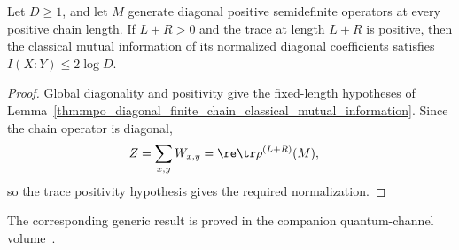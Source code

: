 \begin{corollary}
    \label{cor:mpo_diagonal_classical_mutual_information}
    \leanok
    Let $D\geq1$, and let $M$ generate diagonal positive semidefinite operators
    at every positive chain length. If $L+R>0$ and the trace at length $L+R$
    is positive, then the classical mutual information of its normalized
    diagonal coefficients satisfies $I(X:Y)\leq2\log D$.
\end{corollary}
\begin{proof}\leanok
    Global diagonality and positivity give the fixed-length hypotheses of
    Lemma~\ref{thm:mpo_diagonal_finite_chain_classical_mutual_information}.
    Since the chain operator is diagonal,
    \begin{align}
        Z
         & =\sum_{x,y}W_{x,y}
        =\re\tr\rho^{(L+R)}(M),
        \notag
    \end{align}
    so the trace positivity hypothesis gives the required normalization.
\end{proof}



The corresponding generic result is proved in the companion quantum-channel volume~\cite[``Positivity of the operator-Schmidt rank'']{QICLean2026Blueprint}.


